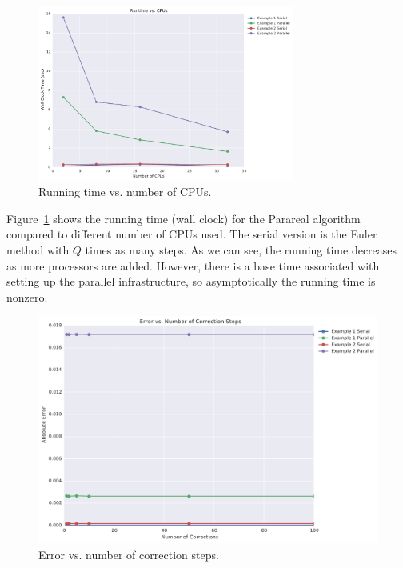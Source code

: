 \documentclass[letterpaper,12pt]{article}
\begin{document}
\begin{figure}[H]
\begin{center}
\includegraphics[width=0.75\textwidth]{data/runtime_vs_cpus.pdf}
\caption{Running time vs. number of CPUs.}
\label{fig:run_v_cpu}
\end{center}
\end{figure}

Figure~\ref{fig:run_v_cpu} shows the running time (wall clock) for the Parareal
algorithm compared to different number of CPUs used. The serial version is the
Euler method with $Q$ times as many steps. As we can see, the running time
decreases as more processors are added. However, there is a base time associated
with setting up the parallel infrastructure, so asymptotically the running time
is nonzero. 

\begin{figure}[H]
\begin{center}
\includegraphics[width=0.75\linewidth]{data/error_vs_corrections.pdf}
\caption{Error vs. number of correction steps.}
\label{fig:err_v_k}
\end{center}
\end{figure}
\end{document}
